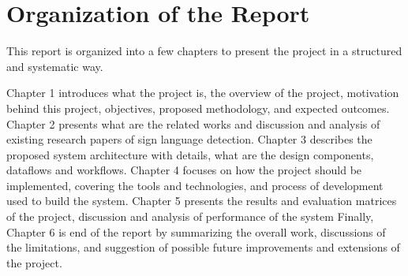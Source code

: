 \section{Organization of the Report}
This report is organized into a few chapters to present the project in a structured and systematic way. 

Chapter 1 introduces what the project is, the overview of the project, motivation behind this project, objectives, proposed methodology, and expected outcomes. 
Chapter 2 presents what are the related works and  discussion and analysis of existing research papers of sign language detection. 
Chapter 3 describes the proposed  system architecture with details, what are the design components, dataflows and workflows. 
Chapter 4 focuses on how the project should be implemented, covering the tools and technologies, and process of development used to build the system. 
Chapter 5 presents the results and evaluation matrices of the project, discussion and analysis of performance of the system  Finally, 
Chapter 6 is end of the report by summarizing the overall work, discussions of the limitations, and suggestion of  possible future improvements and extensions of the project. 

